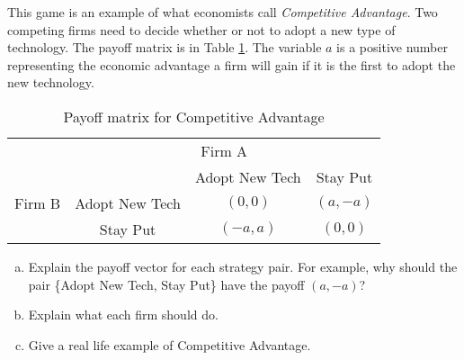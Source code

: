 \begin{xca}\label{E:compadvantage}
This game is an example of what economists call \emph{Competitive Advantage}. Two competing firms need to decide whether or not to adopt a new type of technology. The payoff matrix is in Table \ref{T:compadvantage}. The variable $a$ is a positive number representing the economic advantage a firm will gain if it is the first to adopt the new technology.
 




\begin{table}[h]
\centering

\begin{tabular}{cccc}
                      & \multicolumn{3}{c}{Firm A}                                                  \\ \cline{2-4} 
\multicolumn{1}{l|}{} & \multicolumn{1}{l|}{} & \multicolumn{1}{c|}{Adopt New Tech} & \multicolumn{1}{c|}{Stay Put} \\ \cline{2-4} 
\multicolumn{1}{l|}{Firm B} & \multicolumn{1}{c|}{Adopt New Tech} & \multicolumn{1}{c|}{$(0, 0)$} & \multicolumn{1}{c|}{$(a, -a)$} \\ \cline{2-4} 
\multicolumn{1}{l|}{} & \multicolumn{1}{c|}{Stay Put} & \multicolumn{1}{c|}{$(-a, a)$} & \multicolumn{1}{c|}{$(0, 0)$} \\ \cline{2-4} 
\end{tabular}
\caption{Payoff matrix for Competitive Advantage}
\label{T:compadvantage}
\end{table}


\begin{enumerate}[(a)]
\item Explain the payoff vector for each strategy pair. For example, why should the pair \{Adopt New Tech, Stay Put\} have the payoff $(a, -a)$?

\item Explain what each firm should do.

\item Give a real life example of Competitive Advantage.

\end{enumerate}

\end{xca}



 